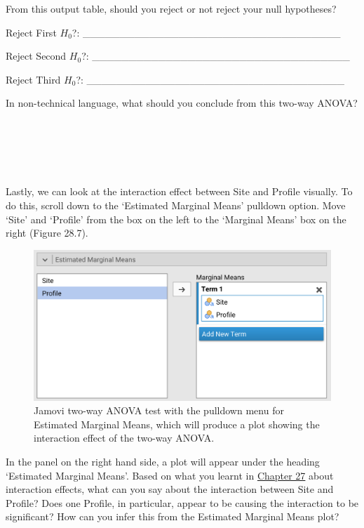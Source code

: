 \documentclass[
]{scrbook}
\begin{document}
From this output table, should you reject or not reject your null hypotheses?

Reject First \(H_{0}\)?: \_\_\_\_\_\_\_\_\_\_\_\_\_\_\_\_\_\_\_\_\_\_\_\_\_\_\_\_\_\_\_\_\_\_\_

Reject Second \(H_{0}\)?: \_\_\_\_\_\_\_\_\_\_\_\_\_\_\_\_\_\_\_\_\_\_\_\_\_\_\_\_\_\_\_\_\_\_\_

Reject Third \(H_{0}\)?: \_\_\_\_\_\_\_\_\_\_\_\_\_\_\_\_\_\_\_\_\_\_\_\_\_\_\_\_\_\_\_\_\_\_\_

In non-technical language, what should you conclude from this two-way ANOVA?

\begin{verbatim}





\end{verbatim}

Lastly, we can look at the interaction effect between Site and Profile visually.
To do this, scroll down to the `Estimated Marginal Means' pulldown option.
Move `Site' and `Profile' from the box on the left to the `Marginal Means' box on the right (Figure 28.7).

\begin{figure}
\includegraphics[width=1\linewidth]{img/jamovi_marginal_means} \caption{Jamovi two-way ANOVA test with the pulldown menu for Estimated Marginal Means, which will produce a plot showing the interaction effect of the two-way ANOVA.}\label{fig:unnamed-chunk-134}
\end{figure}

In the panel on the right hand side, a plot will appear under the heading `Estimated Marginal Means'.
Based on what you learnt in \protect\hyperlink{Chapter_27}{Chapter 27} about interaction effects, what can you say about the interaction between Site and Profile?
Does one Profile, in particular, appear to be causing the interaction to be significant?
How can you infer this from the Estimated Marginal Means plot?
\end{document}
